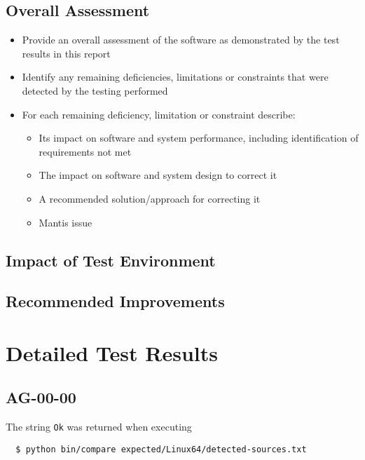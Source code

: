 \documentclass[DM,lsstdraft,STR,toc]{lsstdoc}
\begin{document}
\subsection{Overall Assessment \label{sect:overallassessment}}
\begin{itemize}
\item Provide an overall assessment of the software as demonstrated by the test results in this report
\item Identify any remaining deficiencies, limitations or constraints that were detected by the testing performed
\item For each remaining deficiency, limitation or constraint describe:
\begin{itemize}
\item Its impact on software and system performance, including identification of requirements not met
\item The impact on software and system design to correct it
\item A recommended solution/approach for correcting it
\item Mantis issue
\end{itemize}
\end{itemize}

\subsection{Impact of Test Environment}
\label{sect:impact}

\subsection{Recommended Improvements}
\label{sect:recommendations}


\section{Detailed Test Results}
\label{sect:detailed}

\subsection{AG-00-00}

The string \texttt{Ok} was returned when executing

\begin{verbatim}
  $ python bin/compare expected/Linux64/detected-sources.txt
\end{verbatim}
\end{document}
